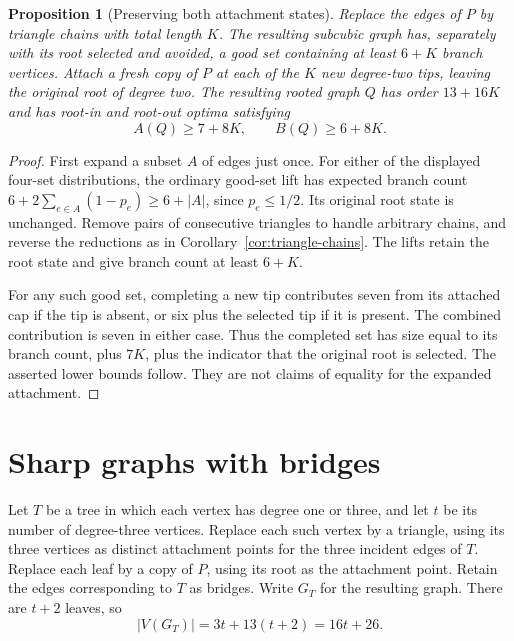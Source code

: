 \documentclass[11pt]{article}
\newtheorem{proposition}[theorem]{Proposition}
\begin{document}
\begin{proposition}[Preserving both attachment states]\label{prop:rooted-expansions}
Replace the edges of $P$ by triangle chains with total length $K$.
The resulting subcubic graph has, separately with its root selected
and avoided, a good set containing at least $6+K$ branch vertices.
Attach a fresh copy of $P$ at each of the $K$ new degree-two tips,
leaving the original root of degree two. The resulting rooted graph
$Q$ has order $13+16K$ and has root-in and root-out optima satisfying
\[
 A(Q)\geq7+8K,\qquad B(Q)\geq6+8K.
\]
\end{proposition}
\begin{proof}
First expand a subset $A$ of edges just once. For either of the
displayed four-set distributions, the ordinary good-set lift has
expected branch count
$6+2\sum_{e\in A}(1-p_e)\geq6+|A|$, since $p_e\leq1/2$.
Its original root state is unchanged. Remove pairs of consecutive
triangles to handle arbitrary chains, and reverse the reductions
as in Corollary~\ref{cor:triangle-chains}. The lifts retain the root
state and give branch count at least $6+K$.

For any such good set, completing a new tip contributes seven from
its attached cap if the tip is absent, or six plus the selected tip
if it is present. The combined contribution is seven in either
case. Thus the completed set has size equal to its branch count,
plus $7K$, plus the indicator that the original root is selected.
The asserted lower bounds follow. They are not claims of equality
for the expanded attachment.
\end{proof}

\section{Sharp graphs with bridges}
Let $T$ be a tree in which each vertex has degree one or three,
and let $t$ be its number of degree-three vertices. Replace each such
vertex by a triangle, using its three vertices as distinct attachment
points for the three incident edges of $T$. Replace each leaf by a
copy of $P$, using its root as the attachment point. Retain the edges
corresponding to $T$ as bridges. Write $G_T$ for the resulting graph.
There are $t+2$ leaves, so
\[
 |V(G_T)|=3t+13(t+2)=16t+26.
\]
\end{document}
